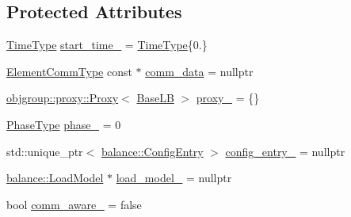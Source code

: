 \subsection*{Protected Attributes}
\begin{DoxyCompactItemize}
\item 
\hyperlink{namespacevt_a2b9f28078dc309ad0706b69ded743e69}{Time\+Type} \hyperlink{structvt_1_1vrt_1_1collection_1_1lb_1_1_base_l_b_a5df60167861bf4058c72f02f3fd39fd8}{start\+\_\+time\+\_\+} = \hyperlink{namespacevt_a2b9f28078dc309ad0706b69ded743e69}{Time\+Type}\{0.\}
\item 
\hyperlink{structvt_1_1vrt_1_1collection_1_1lb_1_1_base_l_b_a83eb4daec14edfb8780422e95b8e38d3}{Element\+Comm\+Type} const  $\ast$ \hyperlink{structvt_1_1vrt_1_1collection_1_1lb_1_1_base_l_b_a8d519b94ce4741da7049cb2b7b513963}{comm\+\_\+data} = nullptr
\item 
\hyperlink{structvt_1_1objgroup_1_1proxy_1_1_proxy}{objgroup\+::proxy\+::\+Proxy}$<$ \hyperlink{structvt_1_1vrt_1_1collection_1_1lb_1_1_base_l_b}{Base\+LB} $>$ \hyperlink{structvt_1_1vrt_1_1collection_1_1lb_1_1_base_l_b_ab5cfe4d0cb73397c5ffe937f119bc71a}{proxy\+\_\+} = \{\}
\item 
\hyperlink{namespacevt_a46ce6733d5cdbd735d561b7b4029f6d7}{Phase\+Type} \hyperlink{structvt_1_1vrt_1_1collection_1_1lb_1_1_base_l_b_a9bb7a04d3ef1012c95322d8375593498}{phase\+\_\+} = 0
\item 
std\+::unique\+\_\+ptr$<$ \hyperlink{structvt_1_1vrt_1_1collection_1_1balance_1_1_config_entry}{balance\+::\+Config\+Entry} $>$ \hyperlink{structvt_1_1vrt_1_1collection_1_1lb_1_1_base_l_b_aab09edd9a749b42a32c5de15001e7774}{config\+\_\+entry\+\_\+} = nullptr
\item 
\hyperlink{structvt_1_1vrt_1_1collection_1_1balance_1_1_load_model}{balance\+::\+Load\+Model} $\ast$ \hyperlink{structvt_1_1vrt_1_1collection_1_1lb_1_1_base_l_b_ae6cd8bdf27d81dc55f9eec9038b347dc}{load\+\_\+model\+\_\+} = nullptr
\item 
bool \hyperlink{structvt_1_1vrt_1_1collection_1_1lb_1_1_base_l_b_a0b7eb81cc499a7cd7c1a6fd1f6a3c8fe}{comm\+\_\+aware\+\_\+} = false
\end{DoxyCompactItemize}
